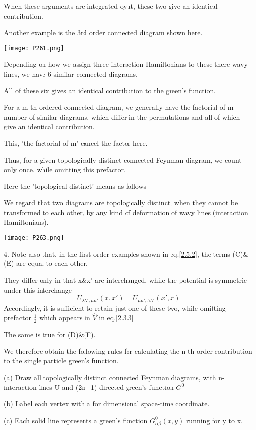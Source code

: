 When these arguments are integrated oyut, these two give an identical contribution.

Another example is the 3rd order connected diagram shown here.
\begin{center}
\texttt{[image: P261.png]}
\end{center}
Depending on how we assign three interaction Hamiltonians to these there wavy lines, we have 6 similar connected diagrams.

All of these six gives an identical contribution to the green's function.

For a m-th ordered connected diagram, we generally have the factorial of m number of similar diagrams, which differ in the permutations and all of which give an identical contribution.

This, 'the factorial of m' cancel the factor here.

Thus, for a given topologically distinct connected Feynman diagram, we count only once, while omitting this prefactor.

Here the 'topological distinct' means as follows

We regard that two diagrams are topologically distinct, when they cannot be transformed to each other, by any kind of deformation of wavy lines (interaction Hamiltonians).
\begin{center}
\texttt{[image: P263.png]}
\end{center}
4. Note also that, in the first order examples shown in eq.\ref{2.5.2}, the terms (C)\&(E) are equal to each other.

They differ only in that x\&x' are interchanged, while the potential is symmetric under this interchange
$$U_{\lambda\lambda',\mu\mu'}(x,x')=U_{\mu\mu',\lambda\lambda'}(x',x)$$
Accordingly, it is sufficient to retain just one of these two, while omitting prefactor $\frac{1}{2}$ which appears in $\hat V$ in eq.\ref{2.3.3}


The same is true for (D)\&(F).

We therefore obtain the following rules for calculating the n-th order contribution to the single particle green's function.

(a) Draw all topologically distinct connected Feynman diagrams, with n-interaction lines U and (2n+1) directed green's function $G^0$

(b) Label each vertex with a for dimensional space-time coordinate.

(c) Each solid line represents a green's function $G_{\alpha\beta}^0(x,y)$ running for y to x.

